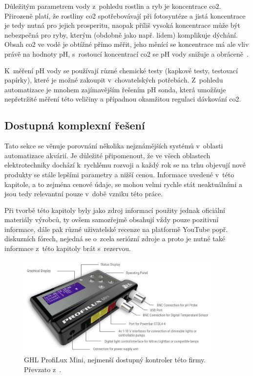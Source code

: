             Důležitým parametrem vody z~pohledu rostlin a ryb je koncentrace \acs{co2}. Přirozeně platí, že rostliny \acs{co2} spotřebovávají při fotosyntéze a jistá koncentrace je tedy nutná pro jejich prosperitu, naopak příliš vysoká koncentrace může být nebezpečná pro ryby, kterým (obdobně jako např. lidem) komplikuje dýchání. Obsah \acs{co2} ve vodě je obtížné přímo měřit, jeho měnící se koncentrace má ale vliv právě na hodnoty pH, s~rostoucí koncentrací \acs{co2} se pH vody snižuje a obráceně~\cite{DvorakJan2014RPpa,KejzlarRadim2022Ařpa}. 

            K~měření pH vody se používají různé chemické testy (kapkové testy, testovací papírky), které je možné zakoupit v~chovatelských potřebách. Z~pohledu automatizace je mnohem zajímavějším řešením pH sonda, která umožňuje nepřetržité měření této veličiny a případnou okamžitou regulaci dávkování \acs{co2}.

             
    \subsection{Dostupná komplexní řešení}
    \label{lab:kapitola-komplexni-reseni}
        Tato sekce se věnuje porovnání několika nejznámějších systémů v~oblasti automatizace akvárií. Je důležité připomenout, že ve všech oblastech elektrotechniky dochází k~rychlému rozvoji a každý rok se na trhu objevují nové produkty se stále lepšími parametry a nižší cenou. Informace uvedené v~této kapitole, a to zejména cenové údaje, se mohou velmi rychle stát neaktuálními a jsou tedy relevantní pouze v~době vzniku této práce.

        Při tvorbě této kapitoly byly jako zdroj informací použity jednak oficiální materiály výrobců, ty ovšem samozřejmě obsahují vždy pouze pozitivní informace, dále pak různé uživatelské recenze na platformě YouTube popř. diskuzních fórech, nejedná se o~zcela seriózní zdroje a proto je nutné také informace z~této kapitoly brát s~rezervou. 

        \begin{figure}[h!]
            \centering
            \includegraphics[width=0.9\textwidth]{obrazky/trh/GHL-ProfiLux-Mini.jpg}
            \caption{GHL ProfiLux Mini, nejmenší dostupný kontroler této firmy. Převzato z~\cite{ghl-profilux}.}
            \label{fig:obrazky-trh-GHL-ProfiLux-Mini-jpg}
        \end{figure}

